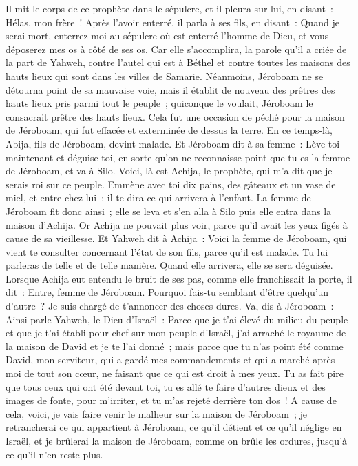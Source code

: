 \begin{multicols}{2}
Il mit le corps de ce prophète dans le sépulcre, et il pleura sur lui, en disant~: Hélas, mon frère~!
Après l'avoir enterré, il parla à ses fils, en disant~: Quand je serai mort, enterrez-moi au sépulcre où est enterré l'homme de Dieu, et vous déposerez mes os à côté de ses os.
Car elle s'accomplira, la parole qu'il a criée de la part de Yahweh, contre l'autel qui est à Béthel et contre toutes les maisons des hauts lieux qui sont dans les villes de Samarie.
Néanmoins, Jéroboam ne se détourna point de sa mauvaise voie, mais il établit de nouveau des prêtres des hauts lieux pris parmi tout le peuple~; quiconque le voulait, Jéroboam le consacrait prêtre des hauts lieux.
Cela fut une occasion de péché pour la maison de Jéroboam, qui fut effacée et exterminée de dessus la terre.
\VerseOne{}En ce temps-là, Abija, fils de Jéroboam, devint malade.
Et Jéroboam dit à sa femme~: Lève-toi maintenant et déguise-toi, en sorte qu'on ne reconnaisse point que tu es la femme de Jéroboam, et va à Silo. Voici, là est Achija, le prophète, qui m'a dit que je serais roi sur ce peuple.
Emmène avec toi dix pains, des gâteaux et un vase de miel, et entre chez lui~; il te dira ce qui arrivera à l'enfant.
La femme de Jéroboam fit donc ainsi~; elle se leva et s'en alla à Silo puis elle entra dans la maison d'Achija. Or Achija ne pouvait plus voir, parce qu'il avait les yeux figés à cause de sa vieillesse.
Et Yahweh dit à Achija~: Voici la femme de Jéroboam, qui vient te consulter concernant l'état de son fils, parce qu'il est malade. Tu lui parleras de telle et de telle manière. Quand elle arrivera, elle se sera déguisée.
Lorsque Achija eut entendu le bruit de ses pas, comme elle franchissait la porte, il dit~: Entre, femme de Jéroboam. Pourquoi fais-tu semblant d'être quelqu'un d'autre~? Je suis chargé de t'annoncer des choses dures.
Va, dis à Jéroboam~: Ainsi parle Yahweh, le Dieu d'Israël~: Parce que je t'ai élevé du milieu du peuple et que je t'ai établi pour chef sur mon peuple d'Israël,
j'ai arraché le royaume de la maison de David et je te l'ai donné~; mais parce que tu n'as point été comme David, mon serviteur, qui a gardé mes commandements et qui a marché après moi de tout son cœur, ne faisant que ce qui est droit à mes yeux.
Tu as fait pire que tous ceux qui ont été devant toi, tu es allé te faire d'autres dieux et des images de fonte, pour m'irriter, et tu m'as rejeté derrière ton dos~!
A cause de cela, voici, je vais faire venir le malheur sur la maison de Jéroboam~; je retrancherai ce qui appartient à Jéroboam, ce qu'il détient et ce qu'il néglige en Israël, et je brûlerai la maison de Jéroboam, comme on brûle les ordures, jusqu'à ce qu'il n'en reste plus.

\end{multicols}

